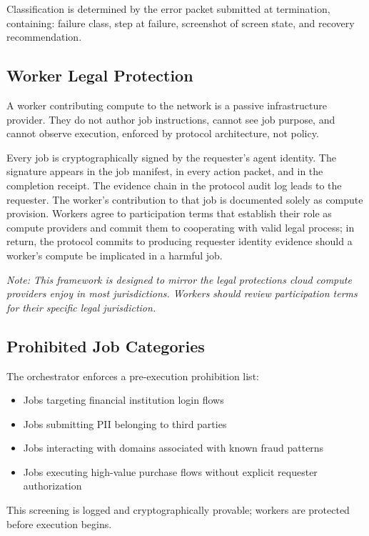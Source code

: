 \documentclass[10pt,twocolumn]{article}
\begin{document}
Classification is determined by the error packet submitted at termination, containing: failure class, step at failure, screenshot of screen state, and recovery recommendation.

\subsection{Worker Legal Protection}

A worker contributing compute to the network is a passive infrastructure provider. They do not author job instructions, cannot see job purpose, and cannot observe execution, enforced by protocol architecture, not policy.

Every job is cryptographically signed by the requester's agent identity. The signature appears in the job manifest, in every action packet, and in the completion receipt. The evidence chain in the protocol audit log leads to the requester. The worker's contribution to that job is documented solely as compute provision. Workers agree to participation terms that establish their role as compute providers and commit them to cooperating with valid legal process; in return, the protocol commits to producing requester identity evidence should a worker's compute be implicated in a harmful job.

\noindent\textit{Note: This framework is designed to mirror the legal protections cloud compute providers enjoy in most jurisdictions. Workers should review participation terms for their specific legal jurisdiction.}

\subsection{Prohibited Job Categories}

The orchestrator enforces a pre-execution prohibition list:
\begin{itemize}[noitemsep,leftmargin=*,topsep=2pt]
  \item Jobs targeting financial institution login flows
  \item Jobs submitting PII belonging to third parties
  \item Jobs interacting with domains associated with known fraud patterns
  \item Jobs executing high-value purchase flows without explicit requester authorization
\end{itemize}
This screening is logged and cryptographically provable; workers are protected before execution begins.
\end{document}
